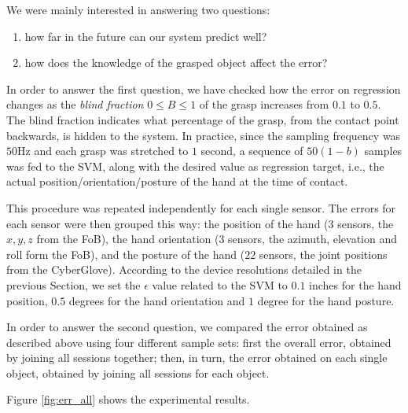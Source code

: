 We were mainly interested in answering two questions:

\begin{enumerate}

  \item how far in the future can our system predict well?

  \item how does the knowledge of the grasped object affect the error?

\end{enumerate}

In order to answer the first question, we have checked how the error
on regression changes as the \emph{blind fraction} $0 \leq B \leq 1$
of the grasp increases from $0.1$ to $0.5$. The blind fraction
indicates what percentage of the grasp, from the contact point
backwards, is hidden to the system. In practice, since the sampling
frequency was $50$Hz and each grasp was stretched to $1$ second, a
sequence of $50(1-b)$ samples was fed to the SVM, along with the
desired value as regression target, i.e., the actual
position/orientation/posture of the hand at the time of contact.

This procedure was repeated independently for each single sensor. The
errors for each sensor were then grouped this way: the position of the
hand ($3$ sensors, the $x,y,z$ from the FoB), the hand orientation
($3$ sensors, the azimuth, elevation and roll form the FoB), and the
posture of the hand ($22$ sensors, the joint positions from the
CyberGlove). According to the device resolutions detailed in the
previous Section, we set the $\epsilon$ value related to the SVM
\cite{SmolaTut2004} to $0.1$ inches for the hand position, $0.5$
degrees for the hand orientation and $1$ degree for the hand posture.

In order to answer the second question, we compared the error obtained
as described above using four different sample sets: first the overall
error, obtained by joining all sessions together; then, in turn, the
error obtained on each single object, obtained by joining all sessions
for each object.

Figure \ref{fig:err_all} shows the experimental results.

